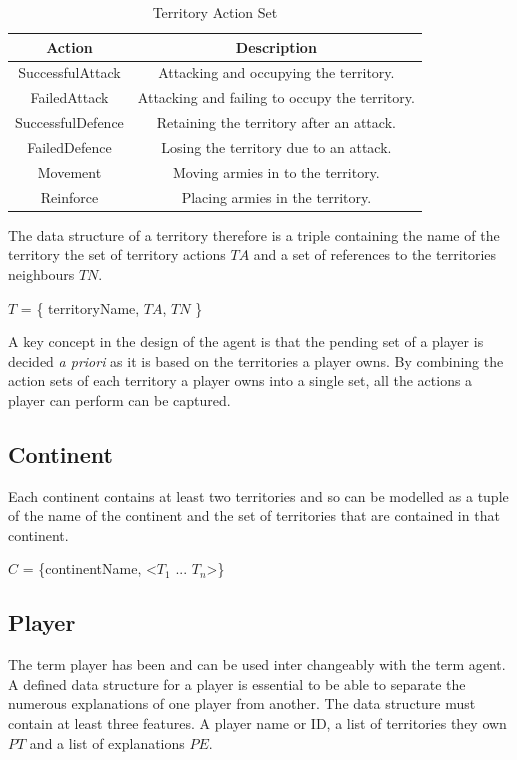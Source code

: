 \documentclass[parskip]{cs4rep}
\begin{document}
\begin{table}[ht]
\centering
\begin{tabular}{|c|c|}
\hline 
\textbf{Action} & \textbf{Description} \\ 
\hline 
SuccessfulAttack & Attacking and occupying the territory.\\ 
\hline 
FailedAttack & Attacking and failing to occupy the territory.\\ 
\hline 
SuccessfulDefence & Retaining the territory after an attack.\\ 
\hline 
FailedDefence & Losing the territory due to an attack.\\
\hline
Movement & Moving armies in to the territory.\\
\hline  
Reinforce & Placing armies in the territory.\\
\hline 
\end{tabular}
\caption{Territory Action Set}
\label{table:territory-actions-bonus}
\end{table}

\newpage

The data structure of a territory therefore is a triple containing the name of the territory the set of territory actions  $TA$ and a set of references to the territories neighbours $TN$.

\centerline{
$T$ = \{ territoryName, $TA$, $TN$ \} 
}

A key concept in the design of the agent is that the pending set of a player is decided \textit{a priori} as it is based on the territories a player owns. By combining the action sets of each territory a player owns into a single set, all the actions a player can perform can be captured.

\subsection{Continent}

Each continent contains at least two territories and so can be modelled as a tuple of the name of the continent and the set of territories that are contained in that continent.

\centerline{
$C$ = \{continentName, <$T_{1}$ ... $T_{n}$>\}
}

\subsection{Player}

The term player has been and can be used inter changeably with the term agent. A defined data structure for a player is essential to be able to separate the numerous explanations of one player from another. The data structure must contain at least three features. A player name or ID, a list of territories they own $PT$ and a list of explanations $PE$.\newline
\end{document}
